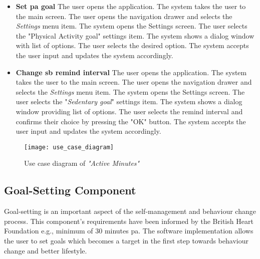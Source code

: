    \begin{itemize}
        \item \textbf{Set \gls{pa} goal}\newline
        The user opens the application. The system takes the user to the main screen. The user opens the navigation drawer and selects the \textit{Settings} menu item. The system opens the Settings screen. The user selects the "Physical Activity goal" settings item. The system shows a dialog window with list of options. The user selects the desired option. The system accepts the user input and updates the system accordingly.
        \item \textbf{Change \gls{sb} remind interval}\newline
        The user opens the application. The system takes the user to the main screen. The user opens the navigation drawer and selects the \textit{Settings} menu item. The system opens the Settings screen. The user selects the "\textit{Sedentary goal}" settings item. The system shows a dialog window providing list of options. The user selects the remind interval and confirms their choice by pressing the "OK" button. The system accepts the user input and updates the system accordingly.
    \end{itemize}
    
    
    \begin{figure}[ht]
        \centering
        \texttt{[image: use\_case\_diagram]}
        \caption{Use case diagram of \textit{"Active Minutes"}}
        \label{fig:use-case-diagram}
    \end{figure}
    
    \subsection{Goal-Setting Component}
    \label{section-goal-setting-component}
    Goal-setting is an important aspect of the self-management and behaviour change process. This component's requirements have been informed by the British Heart Foundation \citep[14]{townsend2015} e.g., minimum of 30 minutes \gls{pa}. The software implementation allows the user to set goals which becomes a target in the first step towards behaviour change and better lifestyle.
    
